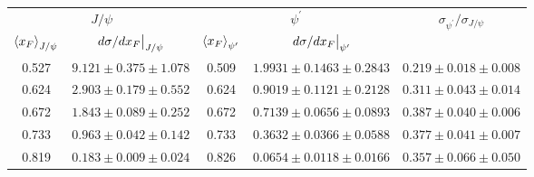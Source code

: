 \begin{tabular}{cc|cc|c}
\hline
\multicolumn{2}{c|}{$J/\psi$} &
  \multicolumn{2}{c|}{$\psi^{\prime}$} &
  \multirow{2}{*}{$\sigma_{\psi^\prime}/\sigma_{J/\psi}$} \\ \cline{1-4}
$\expval{x_F}_{J/\psi}$ &
  $\eval{d\sigma/dx_F}_{J/\psi}$ &
  $\expval{x_F}_{\psi^\prime}$ &
  $\eval{d\sigma/dx_F}_{\psi^\prime}$ &
   \\ \hline
\multicolumn{1}{c|}{0.527} &
  $9.121\pm0.375\pm1.078$ &
  \multicolumn{1}{c|}{0.509} &
  $1.9931\pm0.1463\pm0.2843$ &
  $0.219\pm0.018\pm0.008$ \\
\multicolumn{1}{c|}{0.624} &
  $2.903\pm0.179\pm0.552$ &
  \multicolumn{1}{c|}{0.624} &
  $0.9019\pm0.1121\pm0.2128$ &
  $0.311\pm0.043\pm0.014$ \\
\multicolumn{1}{c|}{0.672} &
  $1.843\pm0.089\pm0.252$ &
  \multicolumn{1}{c|}{0.672} &
  $0.7139\pm0.0656\pm0.0893$ &
  $0.387\pm0.040\pm0.006$ \\
\multicolumn{1}{c|}{0.733} &
  $0.963\pm0.042\pm0.142$ &
  \multicolumn{1}{c|}{0.733} &
  $0.3632\pm0.0366\pm0.0588$ &
  $0.377\pm0.041\pm0.007$ \\
\multicolumn{1}{c|}{0.819} &
  $0.183\pm0.009\pm0.024$ &
  \multicolumn{1}{c|}{0.826} &
  $0.0654\pm0.0118\pm0.0166$ &
  $0.357\pm0.066\pm0.050$ \\ \hline
\end{tabular}
